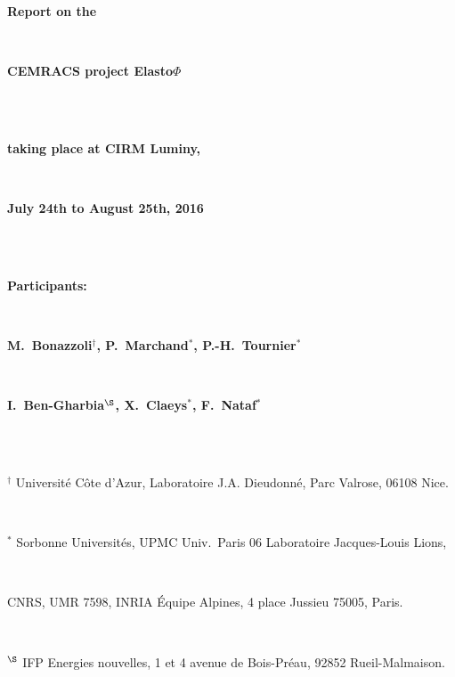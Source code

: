 

\thispagestyle{empty}

\centerline{\textbf{\huge Report on the}}
\quad\\[5pt]
\centerline{\textbf{\huge CEMRACS project Elasto$\Phi$}}
\quad\\[5pt]
\vspace{1cm}
\quad\\
\centerline{\textbf{\Large taking place at CIRM Luminy,}}\quad\\[5pt]
\centerline{\textbf{\Large July 24th to August 25th, 2016}}\quad\\[5pt]
\vspace{1cm}
\quad\\
\centerline{\textbf{\Large Participants:}}\quad\\[15pt]
\centerline{\textbf{\Large M.~Bonazzoli$^{\dagger}$, P.~Marchand$^{*}$, P.-H.~Tournier$^{*}$}}\quad\\[5pt]
\centerline{\textbf{\Large I.~Ben-Gharbia$^{\S}$, X.~Claeys$^{*}$, F.~Nataf$^{*}$}}\quad\\[5pt]
\vspace{0.25cm}\quad\\
\centerline{$^{\dagger}$ Universit\'e C\^ote d'Azur, Laboratoire J.A. Dieudonn\'e, Parc Valrose, 06108 Nice.}\,\\
\centerline{$^{*}$ Sorbonne Universit\'es, UPMC Univ.~Paris 06 Laboratoire Jacques-Louis Lions,}\,\\
\centerline{CNRS, UMR 7598, INRIA \'Equipe Alpines, 4 place Jussieu 75005, Paris.}\,\\
\centerline{$^{\S}$ IFP Energies nouvelles, 1 et 4 avenue de Bois-Pr\'eau, 92852 Rueil-Malmaison.}



